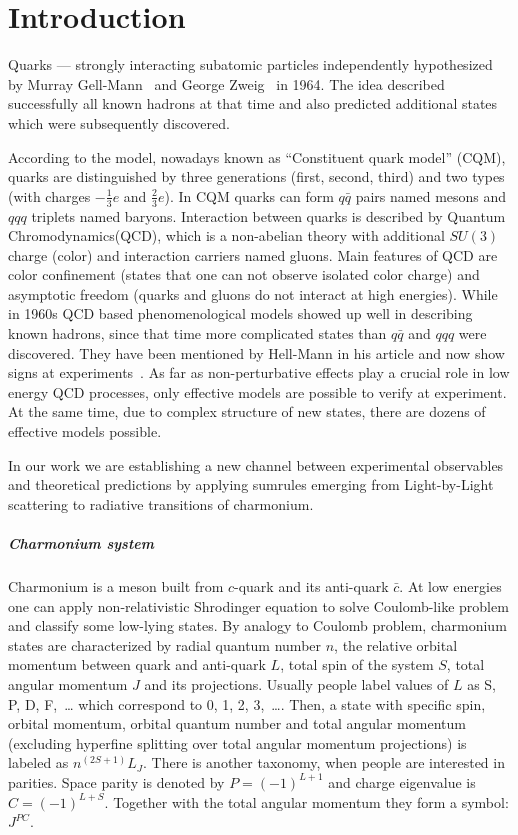 \chapter{Introduction}
Quarks --- strongly interacting subatomic particles independently hypothesized by Murray Gell-Mann~\cite{gellmann-quarks} and George Zweig~\cite{zweig-quarks} in 1964. The idea described successfully all known hadrons at that time and also predicted additional states which were subsequently discovered.

According to the model, nowadays known as ``Constituent quark model'' (CQM), quarks are distinguished by three generations (first, second, third) and two types (with charges $-\frac{1}{3}e$ and $\frac{2}{3}e$). In CQM quarks can form $q \bar{q}$ pairs named mesons and $qqq$ triplets named baryons. Interaction between quarks is described by Quantum Chromodynamics(QCD), which is a non-abelian theory with additional $SU(3)$ charge (color) and  interaction carriers named gluons. Main features of QCD are color confinement (states that one can not observe isolated color charge) and asymptotic freedom (quarks and gluons do not interact at high energies).
While in 1960s QCD based phenomenological models showed up well in describing known hadrons, since that time more complicated states than $q\bar{q}$ and $qqq$ were discovered. They have been mentioned by Hell-Mann in his article and now show signs at experiments~\cite{Xbabar,Xbelle,Ybabar}. As far as non-perturbative effects play a crucial role in low energy QCD processes, only effective models are possible to verify at experiment. At the same time, due to complex structure of new states, there are dozens of effective models possible.

In our work we are establishing a new channel between experimental observables and theoretical predictions by applying sumrules emerging from Light-by-Light scattering to radiative transitions of charmonium.

\paragraph{Charmonium system}
Charmonium is a meson built from $c$-quark and its anti-quark $\bar{c}$. At low energies one can apply non-relativistic Shrodinger equation to solve Coulomb-like problem and classify some low-lying states. By analogy to Coulomb problem, charmonium states are characterized by radial quantum number $n$, the relative orbital momentum between quark and anti-quark $L$, total spin of the system $S$, total angular momentum $J$ and its projections. Usually people label values of $L$ as S, P, D, F,~…  which correspond to 0, 1, 2, 3,~…. Then, a state with specific spin, orbital momentum, orbital quantum number and total angular momentum (excluding hyperfine splitting over total angular momentum projections) is labeled as $n^{(2S+1)} L_J$. There is another taxonomy, when people are interested in parities. Space parity is denoted by $P = (-1)^{L+1}$ and charge eigenvalue is $C = (-1)^{L+S}$. Together with the total angular momentum they form a symbol: $J^{P C}$.

